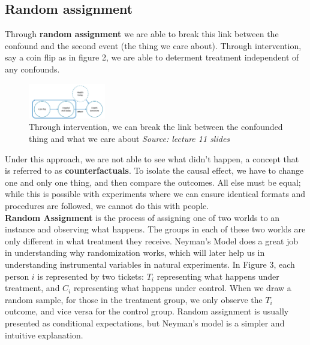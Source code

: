 \subsection{Random assignment}
Through \textbf{random assignment} we are able to break this link between the confound and the second event (the thing we care about).  Through intervention, say a coin flip as in figure 2, we are able to determent treatment independent of any confounds.\\ 

\begin{figure}[ht]
  \begin{center}
    \includegraphics[width=0.3\textwidth]{figures/fig2}
        \caption{Through intervention, we can break the link between the confounded thing and what we care about \textit{ Source: lecture 11 slides}}
    \label{figure 2}
  \end{center}
\end{figure}

Under this approach, we are not able to see what didn't happen, a concept that is referred to as \textbf{counterfactuals}.  To isolate the causal effect, we have to change one and only one thing, and then compare the outcomes.  All else must be equal; while this is possible with experiments where we can ensure identical formats and procedures are followed, we cannot do this with people. \\

\textbf{Random Assignment} is the process of assigning one of two worlds to an instance and observing what happens.  The groups in each of these two worlds are only different in what treatment they receive.  Neyman's Model does a great job in understanding why randomization works, which will later help us in understanding instrumental variables in natural experiments.  In Figure 3, each person $i$ is represented by two tickets: $T_i$ representing what happens under treatment, and $C_i$ representing what happens under control.  When we draw a random sample, for those in the treatment group, we only observe the $T_i$ outcome, and vice versa for the control group.  Random assignment is usually presented as conditional expectations, but Neyman's model is a simpler and intuitive explanation. 

